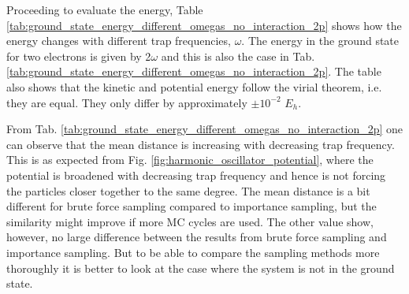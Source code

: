 Proceeding to evaluate the energy, Table \ref{tab:ground_state_energy_different_omegas_no_interaction_2p} shows how the energy changes with different trap frequencies, $\omega$.  The energy in the ground state for two electrons is given by 2$\omega$ and this is also the case in Tab. \ref{tab:ground_state_energy_different_omegas_no_interaction_2p}. The table also shows that the kinetic and potential energy follow the virial theorem, i.e. they are equal. They only differ by approximately $\pm 10^{-2} $ $E_h$.


From Tab. \ref{tab:ground_state_energy_different_omegas_no_interaction_2p} one can observe that the mean distance is increasing with decreasing trap frequency.  This is as expected from Fig. \ref{fig:harmonic_oscillator_potential}, where the potential is broadened with decreasing trap frequency and hence is not forcing the particles closer together to the same degree. The mean distance is a bit different for brute force sampling compared to importance sampling, but the similarity might improve if more MC cycles are used. The other value show, however, no large difference between the results from brute force sampling and importance sampling. But to be able to compare the sampling methods more thoroughly it is better to look at the case where the system is not in the ground state. 

